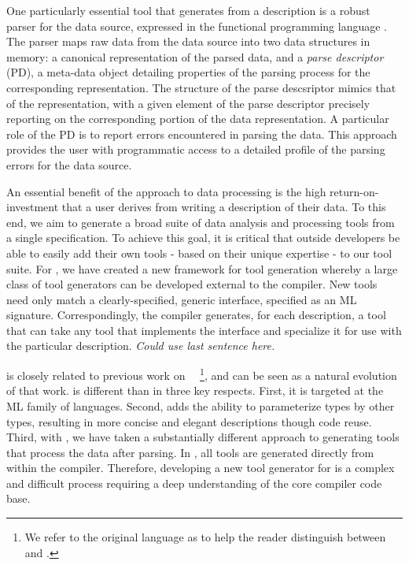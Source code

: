 One particularly essential tool that \padsml{} generates from a
description is a robust parser for the data source, expressed in the
functional programming language \ocaml{}.  The parser maps raw data
from the data source into two data structures in memory: a canonical
representation of the parsed data, and a \textit{parse descriptor}
(PD), a meta-data object detailing properties of the parsing process
for the corresponding representation. The structure of the parse
descsriptor mimics that of the representation, with a given element of
the parse descriptor precisely reporting on the corresponding portion
of the data representation. A particular role of the PD is to report
errors encountered in parsing the data.  This approach provides the
user with programmatic access to a detailed profile of the parsing
errors for the data source.



An essential benefit of the \pads{} approach to data processing is the
high return-on-investment that a user derives from writing a
description of their data. To this end, we aim to generate a broad
suite of data analysis and processing tools from a single
specification. To achieve this goal, it is critical that outside
developers be able to easily add their own tools - based on their
unique expertise - to our tool suite.  For \padsml{}, we have created
a new framework for tool generation whereby a large class of tool
generators can be developed external to the compiler.  New tools need
only match a clearly-specified, generic interface, specified as an ML
signature. Correspondingly, the compiler generates, for each
description, a tool that can take any tool that implements the
interface and specialize it for use with the particular description.
\emph{Could use last sentence here.}

\padsml{} is closely related to previous work on
\padsc{}~\cite{pads-pldi}~\footnote{We refer to the original \pads{}
  language as \padsc{} to help the reader distinguish between \padsc{}
  and \padsml{}.}, and can be seen as a natural evolution of that
work.  \padsml{} is different than \padsc{} in three key respects.
First, it is targeted at the ML family of languages. Second, \padsml{}
adds the ability to parameterize types by other types, resulting in
more concise and elegant descriptions though code reuse. Third, with
\padsml{}, we have taken a substantially different approach to
generating tools that process the data after parsing. In \padsc{}, all
tools are generated directly from within the compiler.  Therefore,
developing a new tool generator for \padsc{} is a complex and
difficult process requiring a deep understanding of the core compiler
code base.

